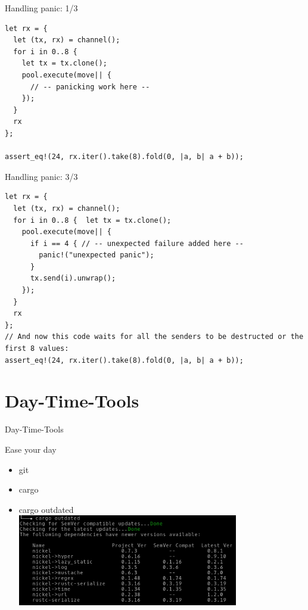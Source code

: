 \documentclass[aspectratio=1610,t]{beamer}
\begin{document}
\begin{frame}[fragile]{Handling panic: 1/3}
  \begin{verbatim}
let rx = {
  let (tx, rx) = channel();
  for i in 0..8 {
    let tx = tx.clone();
    pool.execute(move|| {
      // -- panicking work here --
    });
  }
  rx
};

assert_eq!(24, rx.iter().take(8).fold(0, |a, b| a + b));
  \end{verbatim}
\end{frame}
\begin{frame}[fragile]{Handling panic: 3/3}
  \begin{verbatim}
let rx = {
  let (tx, rx) = channel();
  for i in 0..8 {  let tx = tx.clone();
    pool.execute(move|| {
      if i == 4 { // -- unexpected failure added here --
        panic!("unexpected panic");
      }
      tx.send(i).unwrap();
    });
  }
  rx
};
// And now this code waits for all the senders to be destructed or the first 8 values:
assert_eq!(24, rx.iter().take(8).fold(0, |a, b| a + b));
  \end{verbatim}
\end{frame}

{
\section{Day-Time-Tools}
}
\begin{frame}[fragile]{Day-Time-Tools}

Ease your day

\begin{itemize}[<+- | alert@+>]
  \item git
  \item cargo 
  \item cargo outdated \\ \includegraphics[height=4cm]{cargo_outdated.png}
\end{itemize}

\end{frame}
\end{document}
